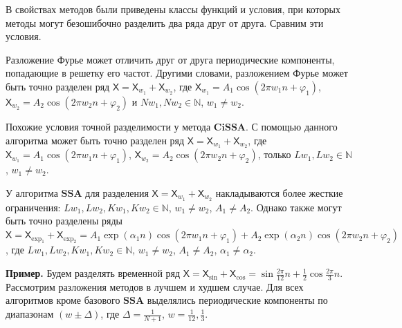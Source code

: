 \documentclass[a4paper, 11pt]{article}
\newcommand{\SSA}{\textbf{SSA}}
\newcommand{\CISSA}{\textbf{CiSSA}}
\newcommand{\TS}{\mathsf{X}}
\begin{document}
В свойствах методов были приведены классы функций и условия, при которых методы могут безошибочно разделить два ряда друг от друга. Сравним эти условия.

Разложение Фурье может отличить друг от друга периодические компоненты, попадающие в решетку его частот. Другими словами, разложением Фурье может быть точно разделен ряд $\TS = \TS_{w_1} + \TS_{w_2}$, где $\TS_{w_1} = A_1 \cos(2\pi w_1 n + \varphi_1)$, $\TS_{w_2} = A_2 \cos(2\pi w_2 n + \varphi_2)$ и $Nw_1, Nw_2 \in \mathbb{N}$, $w_1 \not = w_2$.

Похожие условия точной разделимости у метода $\CISSA$. С помощью данного алгоритма может быть точно разделен ряд $\TS = \TS_{w_1} + \TS_{w_2}$, где $\TS_{w_1} = A_1 \cos(2\pi w_1 n + \varphi_1)$, $\TS_{w_2} = A_2 \cos(2\pi w_2 n + \varphi_2)$, только $Lw_1, Lw_2 \in \mathbb{N}$, $w_1 \not = w_2$.

У алгоритма $\SSA$ для разделения $\TS = \TS_{w_1} + \TS_{w_2}$ накладываются более жесткие ограничения:  $Lw_1, Lw_2, Kw_1, Kw_2 \in \mathbb{N}$, $w_1 \not = w_2$, $A_1 \not = A_2$. Однако также могут быть точно разделены ряды $\TS = \TS_{\exp_1} + \TS_{\exp_2} = A_1 \exp(\alpha_1 n)\cos(2\pi w_1 n + \varphi_1) + A_2 \exp(\alpha_2 n)\cos(2\pi w_2 n + \varphi_2)$, где $Lw_1, Lw_2, Kw_1, Kw_2 \in \mathbb{N}$, $w_1 \not = w_2$, $A_1 \not = A_2$, $\alpha_1 \not = \alpha_2$.

\textbf{\large{Пример.}} Будем разделять временной ряд $\TS = \TS_{\sin} + \TS_{\cos} = \sin{\frac{2\pi}{12}n} + \frac{1}{2}\cos{\frac{2\pi}{3}n}$. Рассмотрим разложения методов в лучшем и худшем случае. Для всех алгоритмов кроме базового $\SSA$ выделялись периодические компоненты по диапазонам $\left(w \pm \Delta \right)$, где $\Delta = \frac{1}{N+1}$, $w = \frac{1}{12}, \frac{1}{3}$.
\end{document}
